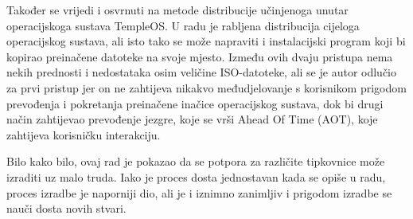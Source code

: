 \documentclass{foi}
\begin{document}
Također se vrijedi i osvrnuti na metode distribucije učinjenoga unutar operacijskoga sustava TempleOS. U radu je rabljena distribucija cijeloga operacijskog sustava, ali isto tako se može napraviti i instalacijski program koji bi kopirao preinačene datoteke na svoje mjesto. Između ovih dvaju pristupa nema nekih prednosti i nedostataka osim veličine ISO-datoteke, ali se je autor odlučio za prvi pristup jer on ne zahtijeva nikakvo međudjelovanje s korisnikom prigodom prevođenja i pokretanja preinačene inačice operacijskog sustava, dok bi drugi način zahtijevao prevođenje jezgre, koje se vrši Ahead Of Time (AOT), koje zahtijeva korisničku interakciju.

Bilo kako bilo, ovaj rad je pokazao da se potpora za različite tipkovnice može izraditi uz malo truda. Iako je proces dosta jednostavan kada se opiše u radu, proces izradbe je naporniji dio, ali je i iznimno zanimljiv i prigodom izradbe se nauči dosta novih stvari.

\printbibliography[title=Popis literature]

\listoffigures
{}





\end{document}
